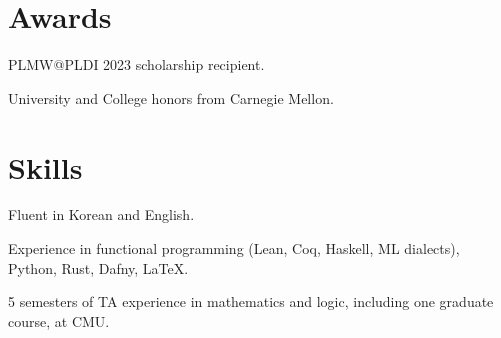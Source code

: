\documentclass[12pt]{article}
\begin{document}
\section{Awards}

PLMW@PLDI 2023 scholarship recipient.

University and College honors from Carnegie Mellon.

\section{Skills}

Fluent in Korean and English.

Experience in functional programming (Lean, Coq, Haskell, ML dialects), Python, Rust, Dafny, LaTeX.

5 semesters of TA experience in mathematics and logic, including one graduate course, at CMU.
\end{document}
